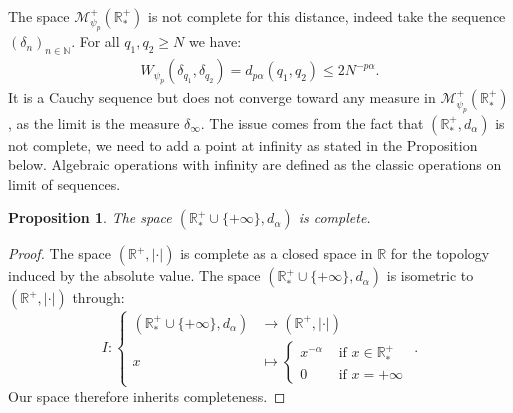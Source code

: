 \documentclass[11pt,a4paper]{article}
\newcommand{\RR}{\mathbb{R}}
\newcommand{\RRP}{\mathbb{R}^+_*}
\newcommand{\MC}{\mathcal{M}}
\newcommand{\Seq}[1]{\left(#1\right)_{n\in \mathbb{N}}}
\newtheorem{proposition}[theorem]{Proposition}
\begin{document}
The space $\MC^+_{\psi_p}\left(\RRP \right)$ is not complete for this distance, indeed take the sequence $\Seq{\delta_{n}}$. For all $q_1,q_2 \geq N$ we have:
\begin{align*}
    W_{\psi_p}\left(\delta_{q_1},\delta_{q_2}\right) = d_{p\alpha}\left(q_1,q_2 \right) \leq 2N^{-p\alpha}.
\end{align*}
It is a Cauchy sequence but does not converge toward any measure in $\MC^+_{\psi_p}\left(\RRP \right)$, as the limit is the measure $\delta_{\infty}$. The issue comes from the fact that $\left(\RRP,d_\alpha\right)$ is not complete, we need to add a point at infinity as stated in the Proposition below. Algebraic operations with infinity are defined as the classic operations on limit of sequences. 
\begin{proposition}
    The space $\left(\RRP \cup \lbrace+\infty\rbrace ,d_\alpha\right)$ is complete. 
\end{proposition}
\begin{proof}
    The space $(\RR^+,|\cdot|)$ is complete as a closed space in $\RR$ for the topology induced by the absolute value. The space $\left(\RRP \cup \lbrace+\infty\rbrace ,d_\alpha\right)$ is isometric to $(\RR^+,|\cdot|)$ through:
    \begin{equation*}
        I :
        \left\lbrace
        \begin{aligned}
            \left(\RRP \cup \lbrace+\infty\rbrace ,d_\alpha\right) &\to (\RR^+,|\cdot|)  \\
            x &\mapsto 
            \left\lbrace 
            \begin{aligned}
                x^{-\alpha} &\text{ if } x \in \RRP \\
                0 &\text{ if } x= +\infty
            \end{aligned}
            \right.
        \end{aligned}
        \right. .
    \end{equation*}
    Our space therefore inherits completeness.
\end{proof}
\end{document}

